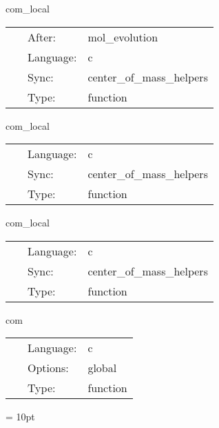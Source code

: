 \vspace{5mm}


\hspace{5mm} com\_local 

\hspace{5mm}{\it setup integrands for com calculation } 


\hspace{5mm}

 \begin{tabular*}{160mm}{cll} 
~ & After:  & mol\_evolution \\ 
~ & Language:  & c \\ 
~ & Sync:  & center\_of\_mass\_helpers \\ 
~ & Type:  & function \\ 
\end{tabular*} 


\vspace{5mm}


\hspace{5mm} com\_local 

\hspace{5mm}{\it setup integrands for com calculation } 


\hspace{5mm}

 \begin{tabular*}{160mm}{cll} 
~ & Language:  & c \\ 
~ & Sync:  & center\_of\_mass\_helpers \\ 
~ & Type:  & function \\ 
\end{tabular*} 


\vspace{5mm}


\hspace{5mm} com\_local 

\hspace{5mm}{\it setup integrands for com calculation } 


\hspace{5mm}

 \begin{tabular*}{160mm}{cll} 
~ & Language:  & c \\ 
~ & Sync:  & center\_of\_mass\_helpers \\ 
~ & Type:  & function \\ 
\end{tabular*} 


\vspace{5mm}


\hspace{5mm} com 

\hspace{5mm}{\it com reductions } 


\hspace{5mm}

 \begin{tabular*}{160mm}{cll} 
~ & Language:  & c \\ 
~ & Options:  & global \\ 
~ & Type:  & function \\ 
\end{tabular*} 



\vspace{5mm}\parskip = 10pt 
